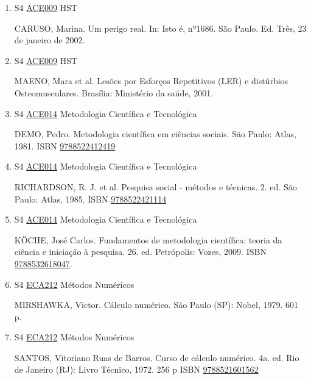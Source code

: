 \documentclass[12pt,a4paper]{book}
\begin{document}
\begin{enumerate}
 
 \item S4 \hyperref[PUD:ACE009]{ACE009} HST

 CARUSO, Marina.  Um perigo real.  In: Isto é, nº1686.  São Paulo.  Ed.  Três, 23 de janeiro de 2002. 
 
 
 \item S4 \hyperref[PUD:ACE009]{ACE009} HST

 MAENO, Mara et al.  Lesões por Esforços Repetitivos (LER) e distúrbios Osteomusculares.  Brasília: Ministério da saúde, 2001.
 \item S4 \hyperref[PUD:ACE014]{ACE014} Metodologia Científica e Tecnológica

  DEMO, Pedro.  Metodologia científica em ciências sociais.  São Paulo: Atlas, 1981.  ISBN \href{http://www.bn.br/site/pages/servicosProfissionais/agenciaISBN/isbnBusca/FbnBuscaISBNCatalogo.asp?pField=ISBN&pIntPagina=1&pISBN=22412419&nidbISBN=true&hidbISBN=true}{9788522412419}
 
 
 \item S4 \hyperref[PUD:ACE014]{ACE014} Metodologia Científica e Tecnológica

  RICHARDSON, R.  J.  et al.  Pesquisa social - métodos e técnicas.  2.  ed.  São Paulo: Atlas, 1985.  ISBN \href{http://www.bn.br/site/pages/servicosProfissionais/agenciaISBN/isbnBusca/FbnBuscaISBNCatalogo.asp?pField=ISBN&pIntPagina=1&pISBN=22421114&nidbISBN=true&hidbISBN=true}{9788522421114}
 
 
 \item S4 \hyperref[PUD:ACE014]{ACE014} Metodologia Científica e Tecnológica

  KÖCHE, José Carlos.  Fundamentos de metodologia científica: teoria da ciência e iniciação à pesquisa.  26.  ed.  Petrópolis: Vozes, 2009.  ISBN \href{http://www.bn.br/site/pages/servicosProfissionais/agenciaISBN/isbnBusca/FbnBuscaISBNCatalogo.asp?pField=ISBN&pIntPagina=1&pISBN=32618047&nidbISBN=true&hidbISBN=true}{9788532618047}.
 \item S4 \hyperref[PUD:ECA212]{ECA212} Métodos Numéricos

 MIRSHAWKA, Victor.  Cálculo numérico.  São Paulo (SP): Nobel, 1979.  601 p. 
 
 
 \item S4 \hyperref[PUD:ECA212]{ECA212} Métodos Numéricos

 SANTOS, Vitoriano Ruas de Barros.  Curso de cálculo numérico.  4a.  ed.  Rio de Janeiro (RJ): Livro Técnico, 1972.  256 p ISBN \href{http://www.bn.br/site/pages/servicosProfissionais/agenciaISBN/isbnBusca/FbnBuscaISBNCatalogo.asp?pField=ISBN&pIntPagina=1&pISBN=21601562&nidbISBN=true&hidbISBN=true}{9788521601562}
 

\end{enumerate}
\end{document}
